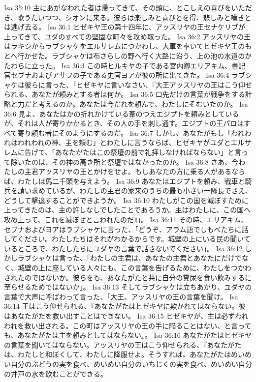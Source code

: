 Isa 35:10  主にあがなわれた者は帰ってきて、その頭に、とこしえの喜びをいただき、歌うたいつつ、シオンに来る。彼らは楽しみと喜びとを得、悲しみと嘆きとは逃げ去る。
Isa 36:1  ヒゼキヤ王の第十四年に、アッスリヤの王セナケリブが上ってきて、ユダのすべての堅固な町々を攻め取った。
Isa 36:2  アッスリヤの王はラキシからラブシャケをエルサレムにつかわし、大軍を率いてヒゼキヤ王のもとへ行かせた。ラブシャケは布さらしの野へ行く大路に沿う、上の池の水道のかたわらに立った。
Isa 36:3  この時ヒルキヤの子である宮内卿エリアキム、書記官セブナおよびアサフの子である史官ヨアが彼の所に出てきた。
Isa 36:4  ラブシャケは彼らに言った、「ヒゼキヤに言いなさい、『大王アッスリヤの王はこう仰せられる、あなたが頼みとする者は何か。
Isa 36:5  口先だけの言葉が戦争をする計略と力だと考えるのか。あなたは今だれを頼んで、わたしにそむいたのか。
Isa 36:6  見よ、あなたはかの折れかけている葦のつえエジプトを頼みとしているが、それは人が寄りかかるとき、その人の手を刺し通す。エジプトの王パロはすべて寄り頼む者にそのようにするのだ。
Isa 36:7  しかし、あなたがもし「われわれはわれわれの神、主を頼む」とわたしに言うならば、ヒゼキヤがユダとエルサレムに告げて、「あなたがたはこの祭壇の前で礼拝しなければならない」と言って除いたのは、その神の高き所と祭壇ではなかったのか。
Isa 36:8  さあ、今わたしの主君アッスリヤの王とかけをせよ。もしあなたの方に乗る人があるならば、わたしは馬二千頭を与えよう。
Isa 36:9  あなたはエジプトを頼み、戦車と騎兵を請い求めているが、わたしの主君の家来のうちの最も小さい一隊長でさえ、どうして撃退することができようか。
Isa 36:10  わたしがこの国を滅ぼすために上ってきたのは、主の許しなしでしたことであろうか。主はわたしに、この国へ攻め上って、これを滅ぼせと言われたのだ』」。
Isa 36:11  その時、エリアキム、セブナおよびヨアはラブシャケに言った、「どうぞ、アラム語でしもべたちに話してください。わたしたちはそれがわかるからです。城壁の上にいる民の聞いているところで、わたしたちにユダヤの言葉で話さないでください」。
Isa 36:12  しかしラブシャケは言った、「わたしの主君は、あなたの主君とあなたにだけでなく、城壁の上に座している人々にも、この言葉を告げるために、わたしをつかわされたのではないか。彼らをも、あなたがたと共に自分の糞尿を食い飲みするに至らせるためではないか」。
Isa 36:13  そしてラブシャケは立ちあがり、ユダヤの言葉で大声に呼ばわって言った、「大王、アッスリヤの王の言葉を聞け。
Isa 36:14  王はこう仰せられる、『あなたがたはヒゼキヤに欺かれてはならない。彼はあなたがたを救い出すことはできない。
Isa 36:15  ヒゼキヤが、主は必ずわれわれを救い出される。この町はアッスリヤの王の手に陥ることはない、と言っても、あなたがたは主を頼みとしてはならない』。
Isa 36:16  あなたがたはヒゼキヤの言葉を聞いてはならない。アッスリヤの王はこう仰せられる、『あなたがたは、わたしと和ぼくして、わたしに降服せよ。そうすれば、あなたがたはめいめい自分のぶどうの実を食べ、めいめい自分のいちじくの実を食べ、めいめい自分の井戸の水を飲むことができる。
